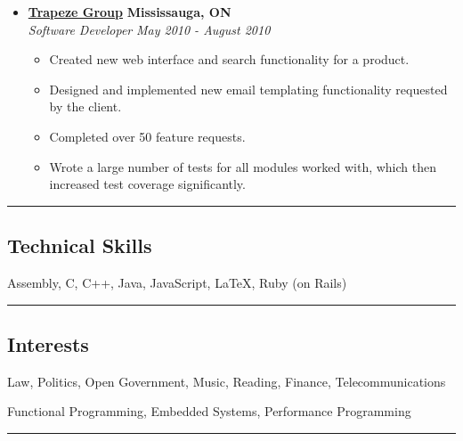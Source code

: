 \documentclass[10pt,letterpaper]{article}
\begin{document}
\begin{itemize}
    \item[]
    {\href{http://www.trapezegroup.com/}{\textbf{Trapeze Group}} \hfill
      \textbf{Mississauga, ON}}
    \\
    {\emph{Software Developer} \hfill \emph{May 2010 - August 2010}}

    \begin{itemize}[label=\textbullet]
      \itemsep0em
      \item Created new web interface and search functionality for a product.
      \item Designed and implemented new email templating functionality
            requested by the client.
      \item Completed over 50 feature requests.
      \item Wrote a large number of tests for all modules worked with, which
            then increased test coverage significantly.
    \end{itemize}
  \end{itemize}


\hrule
\vspace{-0.4em}
\subsection*{Technical Skills}
\begin{description}[labelindent=\parindent]
  \item[Languages:]
  Assembly, C, C++, Java, JavaScript, \LaTeX, Ruby (on Rails)
\end{description}

\hrule
\vspace{-0.4em}
\subsection*{Interests}
\begin{description}[labelindent=\parindent]
  \item[Personal:]
  Law, Politics, Open Government, Music, Reading, Finance, Telecommunications
  \item[Technical:]
  Functional Programming, Embedded Systems, Performance Programming
\end{description}

\hrule
\vspace{-0.4em}
\end{document}
